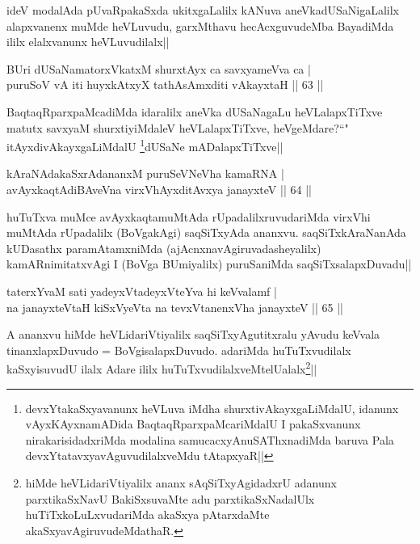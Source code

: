 \begin{artha}
ideV modalAda pUvaRpakaSxda ukitxgaLalilx kANuva aneVkadUSaNigaLalilx alapxvanenx muMde heVLuvudu, garxMthavu hecAcxguvudeMba BayadiMda ililx elalxvanunx heVLuvudilalx||
\end{artha}


\begin{shl}
BUri dUSaNamatorxVkatxM shurxtAyx ca savxyameVva ca |\\
puruSoV vA iti huyxkAtxyX tathA\s sAmxditi vAkayxtaH \hfill || 63 ||
\end{shl}

\begin{artha}
BaqtaqRparxpaMcadiMda idaralilx aneVka dUSaNagaLu heVLalapxTiTxve matutx savxyaM 
shurxtiyiMdaleV heVLalapxTiTxve, heVgeMdare?``\stext" itAyxdivAkayxgaLiMdalU
\footnote{devxYtakaSxyavanunx heVLuva iMdha shurxtivAkayxgaLiMdalU, idanunx vAyxKAyxnamADida BaqtaqRparxpaMcariMdalU I pakaSxvanunx nirakarisidadxriMda modalina samucacxyAnuSAThxnadiMda baruva Pala  devxYtatavxyavAguvudilalxveMdu tAtapxyaR||}dUSaNe 
mADalapxTiTxve||
\end{artha}


\begin{shl}
kAraNAdakaSxrAdananxM puruSeVNeVha kamaRNA |\\
avAyxkaqtAdiBAveVna virxVhAyxditAvxya janayxteV \hfill || 64 ||
\end{shl}

\begin{artha}
huTuTxva muMce avAyxkaqtamuMtAda rUpadalilxruvudariMda virxVhi muMtAda rUpadalilx (BoVgakAgi) saqSiTxyAda ananxvu. saqSiTxkAraNanAda kUDasathx paramAtamxniMda (ajAcnxnavAgiruvadasheyalilx) kamARnimitatxvAgi I (BoVga BUmiyalilx) puruSaniMda saqSiTxsalapxDuvadu||
\end{artha}


\begin{shl}
taterxYvaM sati yadeyxVtadeyxVteYva hi keVvalamf |\\
na janayxteV\s taH kiSxVyeVta na tevxVtanenxVha janayxteV \hfill || 65 ||
\end{shl}

\begin{artha}
A ananxvu hiMde heVLidariVtiyalilx saqSiTxyAgutitxralu yAvudu keVvala tinanxlapxDuvudo = BoVgisalapxDuvudo. adariMda huTuTxvudilalx kaSxyisuvudU ilalx Adare ililx huTuTxvudilalxveMtelUalalx\footnote{hiMde heVLidariVtiyalilx ananx sAqSiTxyAgidadxrU adanunx parxtikaSxNavU BakiSxsuvaMte adu parxtikaSxNadalUlx huTiTxkoLuLxvudariMda akaSxya pAtarxdaMte akaSxyavAgiruvudeMdathaR.}||
\end{artha}

